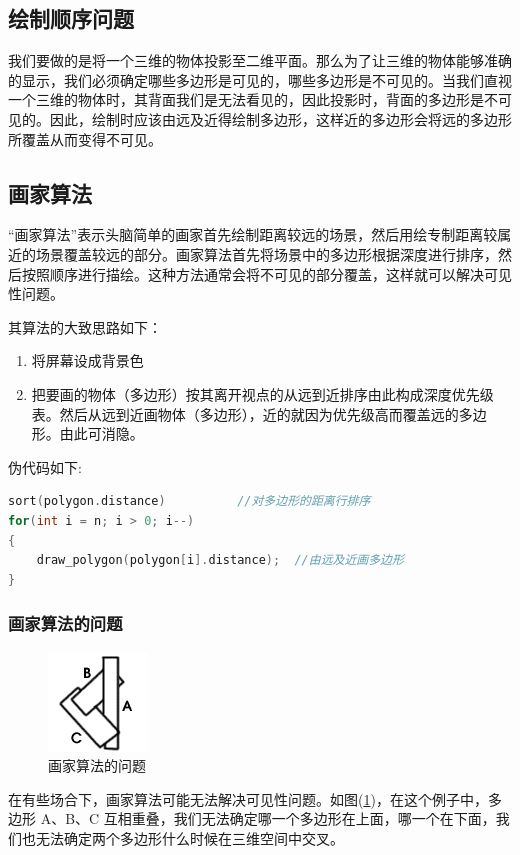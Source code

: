 \documentclass[12pt,oneside,a4paper]{ctexart}
\begin{document}
\subsection{绘制顺序问题}
我们要做的是将一个三维的物体投影至二维平面。那么为了让三维的物体能够准确的显示，我们必须确定哪些多边形是可见的，哪些多边形是不可见的。当我们直视一个三维的物体时，其背面我们是无法看见的，因此投影时，背面的多边形是不可见的。因此，绘制时应该由远及近得绘制多边形，这样近的多边形会将远的多边形所覆盖从而变得不可见。
\subsection{画家算法}
“画家算法”表示头脑简单的画家首先绘制距离较远的场景，然后用绘专制距离较属近的场景覆盖较远的部分。画家算法首先将场景中的多边形根据深度进行排序，然后按照顺序进行描绘。这种方法通常会将不可见的部分覆盖，这样就可以解决可见性问题。

其算法的大致思路如下：
\begin{enumerate}
	\item 将屏幕设成背景色
	\item 把要画的物体（多边形）按其离开视点的从远到近排序由此构成深度优先级表。然后从远到近画物体（多边形），近的就因为优先级高而覆盖远的多边形。由此可消隐。
\end{enumerate}

伪代码如下:
\newline
\begin{lstlisting}[language=c++]
sort(polygon.distance)			//对多边形的距离行排序
for(int i = n; i > 0; i--)
{
	draw_polygon(polygon[i].distance);	//由远及近画多边形
}
\end{lstlisting}
\subsubsection{画家算法的问题}
\begin{figure}[H]
	\centering
	\includegraphics[scale=0.9]{Picture/latex4.4.png}
	\vspace{-2ex}
	\caption{画家算法的问题}
	\label{PainterProblem}
\end{figure}

在有些场合下，画家算法可能无法解决可见性问题。如图(\ref{PainterProblem})，在这个例子中，多边形 A、B、C 互相重叠，我们无法确定哪一个多边形在上面，哪一个在下面，我们也无法确定两个多边形什么时候在三维空间中交叉。
\end{document}
